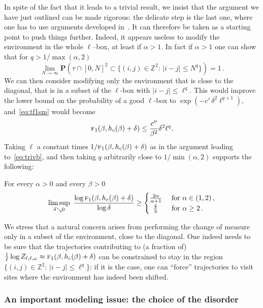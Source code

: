 \documentclass[AHL,Unicode,longabstracts]{cedram}
\newcommand{\ga}{\alpha}
\newcommand{\gb}{\beta}
\newcommand{\gd}{\delta}
\newcommand{\go}{\omega}
\newcommand{\tf}{\textsc{f}} %
\newcommand{\bP}{\ensuremath{\mathbf{P}}}
\newcommand{\bbZ}{\ensuremath{\mathbb{Z}}}
\begin{document}
In spite of the fact that it leads to a trivial result, we insist that the argument we have just outlined can be made rigorous: the delicate step is the last one, where one has to use arguments developed in~\cite{cf:GTalea}. It can therefore be taken as a starting point to push things further. Indeed, it appears useless to modify the environment in the whole $\ell$--box, at least if $\ga>1$. In fact if $\ga>1$ one can show that for $q>1/ \max(\ga,2)$
\begin{equation}\label{eq:evin}
\lim_{N \to \infty}\bP \left(\tau \cap [0, N]^2 \subset \{(i,j) \in \bbZ^2:\,\vert i-j \vert \le N^q \}\right)= 1\,.
\end{equation}
We can then consider modifying only the environment that is close to the diagonal, that is in a subset of the $\ell$-box with $|i-j|\leq \ell^q$. This would improve the lower bound on the probability of a good $\ell$-box to $\exp(- c'\,\gd^2 \ell^{q+1})$, and~\eqref{eq:tf1sm} would become
\[
\tf_1(\gb,h_c(\gb)+\gd) \leq \frac{c''}{\gb^2} \gd^2 \ell^{q}.
\]
Taking $\ell$ a constant times $1/\tf_1(\gb,h_c(\gb)+\gd)$ as in the argument leading to~\eqref{eq:trivb}, and then taking $q$ arbitrarily close to $1/\min(\alpha,2)$ supports the following:
\begin{conj}
For every $\ga>0$ and every $\gb >0$\label{conj:smoothing}
\begin{equation}
\limsup_{\gd \searrow 0} \
\frac{\log \tf_1 (\gb, h_c(\gb)+\gd) }{\log \gd}\ge
\begin{cases}
\frac{2\ga}{\ga+1} & \text{ for } \ga \in (1,2)\,,
\\
\;\:\frac{4}{3} & \text{ for } \ga \ge 2\,.
\end{cases}
\end{equation}
\end{conj}

We stress that a natural concern arises from performing the change of measure only in a subset of the environment, close to the diagonal. One indeed needs to be sure that the trajectories contributing to (a fraction of) $ \frac{1}{\ell} \log Z_{\ell,\ell,\go} \approx \tf_1(\gb,h_c(\gb)+\gd)$ can be constrained to stay in the region $\{(i,j) \in \bbZ^2:\,\vert i-j \vert \le \ell^q \}$: if it is the case, one can ``force'' trajectories to visit sites where the environment has indeed been shifted.

\subsubsection{An important modeling issue: the choice of the disorder}
\end{document}
